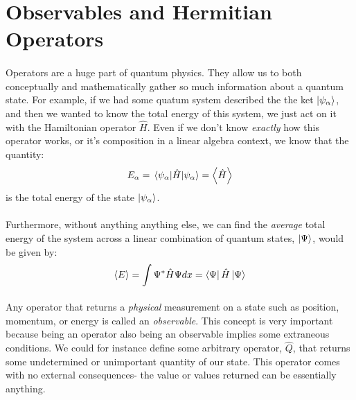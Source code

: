 \documentclass[12pt,letterpaper]{book}
\begin{document}

\section{Observables and Hermitian Operators}

\paragraph*{}Operators are a huge part of quantum physics. They allow us to both conceptually and mathematically gather so much information about a quantum state. For example, if we had some quatum system described the the ket 
$\ket{\psi_\alpha}$, and then we wanted to know the total energy of this system, we just act on it with the Hamiltonian operator $\hat{H}$. Even if we don't know \textit{exactly} how this operator works, or it's composition in a linear algebra context, we know that the quantity:
\begin{equation}
E_\alpha = \expval{\hat{H}}{\psi_\alpha} = \expval{\hat{H}}
\end{equation}
is the total energy of the state $\ket{\psi_\alpha}$.
\paragraph*{}Furthermore, without anything anything else, we can find the \textit{average} total energy of the system across a linear combination of quantum states, $\ket{\Psi}$, would be given by:
\begin{equation}
\label{expect-val}
\expval{E} = \int \Psi^* \hat{H} \Psi dx = \bra{\Psi}\hat{H}\ket{\Psi}	
\end{equation}
\paragraph*{}Any operator that returns a \textit{physical} measurement on a state such as position, momentum, or energy is called an \textit{observable}. This concept is very important because being an operator also being an observable implies some extraneous conditions. We could for instance define some arbitrary operator, $\hat{Q}$, that returns some undetermined or unimportant quantity of our state. This operator comes with no external consequences- the value or values returned can be essentially anything.
\end{document}
